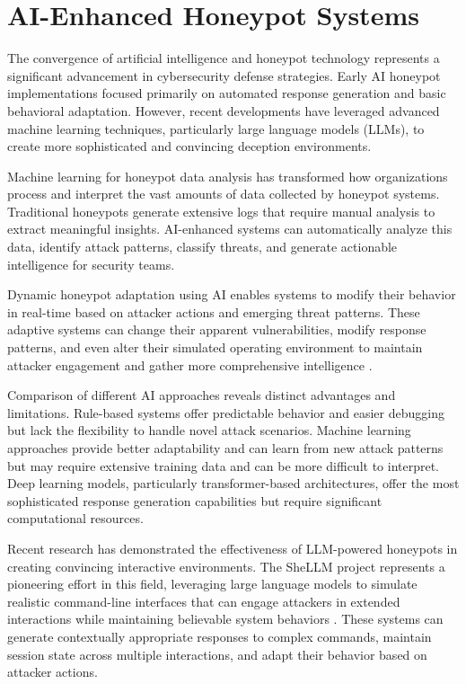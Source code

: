 \section{AI-Enhanced Honeypot Systems}

The convergence of artificial intelligence and honeypot technology represents a significant advancement in cybersecurity defense strategies. Early AI honeypot implementations focused primarily on automated response generation and basic behavioral adaptation. However, recent developments have leveraged advanced machine learning techniques, particularly large language models (LLMs), to create more sophisticated and convincing deception environments.

Machine learning for honeypot data analysis has transformed how organizations process and interpret the vast amounts of data collected by honeypot systems. Traditional honeypots generate extensive logs that require manual analysis to extract meaningful insights. AI-enhanced systems can automatically analyze this data, identify attack patterns, classify threats, and generate actionable intelligence for security teams.

Dynamic honeypot adaptation using AI enables systems to modify their behavior in real-time based on attacker actions and emerging threat patterns. These adaptive systems can change their apparent vulnerabilities, modify response patterns, and even alter their simulated operating environment to maintain attacker engagement and gather more comprehensive intelligence \cite{Otal2024}.

Comparison of different AI approaches reveals distinct advantages and limitations. Rule-based systems offer predictable behavior and easier debugging but lack the flexibility to handle novel attack scenarios. Machine learning approaches provide better adaptability and can learn from new attack patterns but may require extensive training data and can be more difficult to interpret. Deep learning models, particularly transformer-based architectures, offer the most sophisticated response generation capabilities but require significant computational resources.

Recent research has demonstrated the effectiveness of LLM-powered honeypots in creating convincing interactive environments. The SheLLM project represents a pioneering effort in this field, leveraging large language models to simulate realistic command-line interfaces that can engage attackers in extended interactions while maintaining believable system behaviors \cite{sladic2023}. These systems can generate contextually appropriate responses to complex commands, maintain session state across multiple interactions, and adapt their behavior based on attacker actions.

